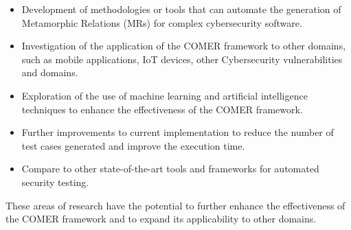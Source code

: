 \begin{itemize}
\item Development of methodologies or tools that can automate the generation of Metamorphic Relations (MRs) for complex cybersecurity software.
\item Investigation of the application of the COMER framework to other domains, such as mobile applications, IoT devices, other Cybersecurity vulnerabilities and domains.
\item Exploration of the use of machine learning and artificial intelligence techniques to enhance the effectiveness of the COMER framework.
\item Further improvements to current implementation to reduce the number of test cases generated and improve the execution time.
\item Compare to other state-of-the-art tools and frameworks for automated security testing.
\end{itemize}

These areas of research have the potential to further enhance the effectiveness of the COMER framework and to expand its applicability to other domains.
